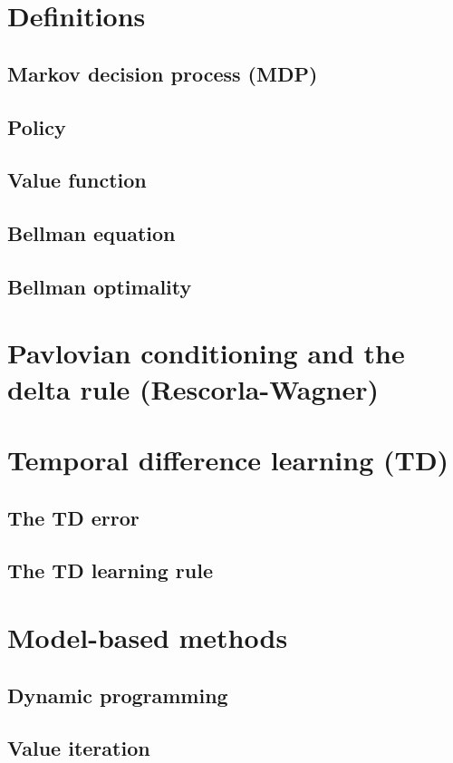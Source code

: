 \documentclass[11pt]{book} %
\begin{document}
\section{Definitions}
\subsection{Markov decision process (MDP)}
\subsection{Policy}
\subsection{Value function}
\subsection{Bellman equation}
\subsection{Bellman optimality}

\section{Pavlovian conditioning and the delta rule (Rescorla-Wagner)}

\section{Temporal difference learning (TD)}
\subsection{The TD error}
\subsection{The TD learning rule}

\section{Model-based methods}
\subsection{Dynamic programming}
\subsection{Value iteration}
\end{document}
